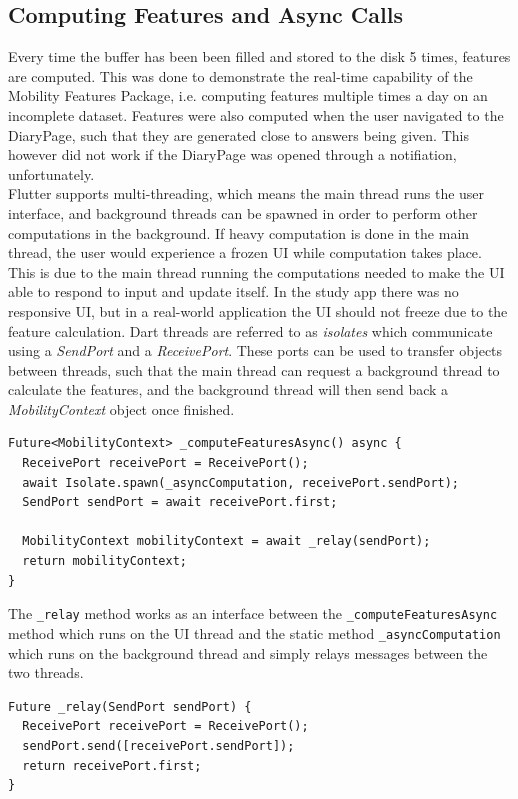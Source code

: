 \subsection{Computing Features and Async Calls}
Every time the buffer has been been filled and stored to the disk 5 times, features are computed. This was done to demonstrate the real-time capability of the Mobility Features Package, i.e. computing features multiple times a day on an incomplete dataset. Features were also computed when the user navigated to the DiaryPage, such that they are generated close to answers being given. This however did not work if the DiaryPage was opened through a notifiation, unfortunately.\\

Flutter supports multi-threading, which means the main thread runs the user interface, and background threads can be spawned in order to perform other computations in the background. If heavy computation is done in the main thread, the user would experience a frozen UI while computation takes place. This is due to the main thread running the computations needed to make the UI able to respond to input and update itself. In the study app there was no responsive UI, but in a real-world application the UI should not freeze due to the feature calculation. Dart threads are referred to as \textit{isolates} which communicate using a \textit{SendPort} and a \textit{ReceivePort}. These ports can be used to transfer objects between threads, such that the main thread can request a background thread to calculate the features, and the background thread will then send back a \textit{MobilityContext} object once finished. 

\begin{verbatim}
Future<MobilityContext> _computeFeaturesAsync() async {
  ReceivePort receivePort = ReceivePort();
  await Isolate.spawn(_asyncComputation, receivePort.sendPort);
  SendPort sendPort = await receivePort.first;

  MobilityContext mobilityContext = await _relay(sendPort);
  return mobilityContext;
}
\end{verbatim}

The \verb|_relay| method works as an interface between the \verb|_computeFeaturesAsync| method which runs on the UI thread and the static method \verb|_asyncComputation| which runs on the background thread and simply relays messages between the two threads.

\begin{verbatim}
Future _relay(SendPort sendPort) {
  ReceivePort receivePort = ReceivePort();
  sendPort.send([receivePort.sendPort]);
  return receivePort.first;
}
\end{verbatim}

